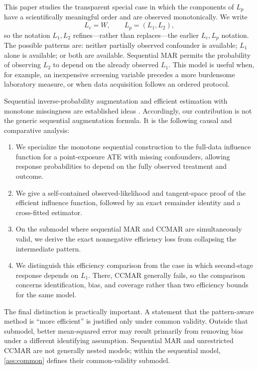 \documentclass[11pt]{article}
\theoremstyle{definition}
\newcommand{\1}{\mathbf{1}}
\begin{document}
This paper studies the transparent special case in which the components of $L_p$ have a scientifically meaningful order and are observed monotonically. We write
\[
L_c=W,\qquad L_p=(L_1,L_2),
\]
so the notation $L_1,L_2$ refines---rather than replaces---the earlier $L_c,L_p$ notation. The possible patterns are: neither partially observed confounder is available; $L_1$ alone is available; or both are available. Sequential MAR permits the probability of observing $L_2$ to depend on the already observed $L_1$. This model is useful when, for example, an inexpensive screening variable precedes a more burdensome laboratory measure, or when data acquisition follows an ordered protocol.

Sequential inverse-probability augmentation and efficient estimation with monotone missingness are established ideas \citep{rrz1994,gill1997,tsiatis2006,barnwell2025}. Accordingly, our contribution is not the generic sequential augmentation formula. It is the following causal and comparative analysis:
\begin{enumerate}[leftmargin=*,itemsep=3pt]
\item We specialize the monotone sequential construction to the full-data influence function for a point-exposure ATE with missing confounders, allowing response probabilities to depend on the fully observed treatment and outcome.
\item We give a self-contained observed-likelihood and tangent-space proof of the efficient influence function, followed by an exact remainder identity and a cross-fitted estimator.
\item On the submodel where sequential MAR and CCMAR are simultaneously valid, we derive the exact nonnegative efficiency loss from collapsing the intermediate pattern.
\item We distinguish this efficiency comparison from the case in which second-stage response depends on $L_1$. There, CCMAR generally fails, so the comparison concerns identification, bias, and coverage rather than two efficiency bounds for the same model.
\end{enumerate}

The final distinction is practically important. A statement that the pattern-aware method is ``more efficient'' is justified only under common validity. Outside that submodel, better mean-squared error may result primarily from removing bias under a different identifying assumption. Sequential MAR and unrestricted CCMAR are not generally nested models; within the sequential model, \cref{ass:common} defines their common-validity submodel.
\end{document}
